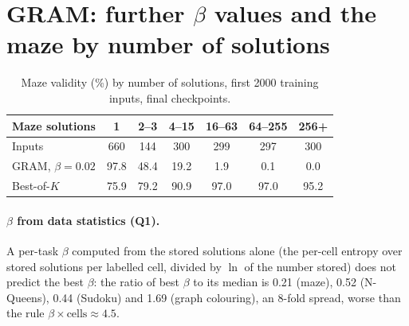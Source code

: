 \documentclass[11pt]{article}
\newcommand{\Bok}{Best-of-$K$}
\begin{document}
\section{GRAM: further $\beta$ values and the maze by number of solutions}

\begin{table}[h]
\centering\small
{}
\caption{Extra $\beta$ points and training KL (before multiplying by $\beta$), read off training curves; blank where
not read. Maze posterior sampling at $\frac14$: 94\% valid.}
\end{table}

\begin{table}[h]
\centering\small
\begin{tabular}{@{}lcccccc@{}}
\toprule
Maze solutions & 1 & 2--3 & 4--15 & 16--63 & 64--255 & 256+ \\
\midrule
Inputs & 660 & 144 & 300 & 299 & 297 & 300 \\
GRAM, $\beta=0.02$ & 97.8 & 48.4 & 19.2 & 1.9 & 0.1 & 0.0 \\
\Bok & 75.9 & 79.2 & 90.9 & 97.0 & 97.0 & 95.2 \\
\bottomrule
\end{tabular}
\caption{Maze validity (\%) by number of solutions, first 2000 training inputs, final checkpoints.}
\end{table}

\paragraph{$\beta$ from data statistics (Q1).} A per-task $\beta$ computed from the stored solutions alone (the
per-cell entropy over stored solutions per labelled cell, divided by $\ln$ of the number stored) does not predict the
best $\beta$: the ratio of best $\beta$ to its median is 0.21 (maze), 0.52 (N-Queens), 0.44 (Sudoku) and 1.69 (graph
colouring), an 8-fold spread, worse than the rule $\beta\times\text{cells}\approx4.5$.
\end{document}
